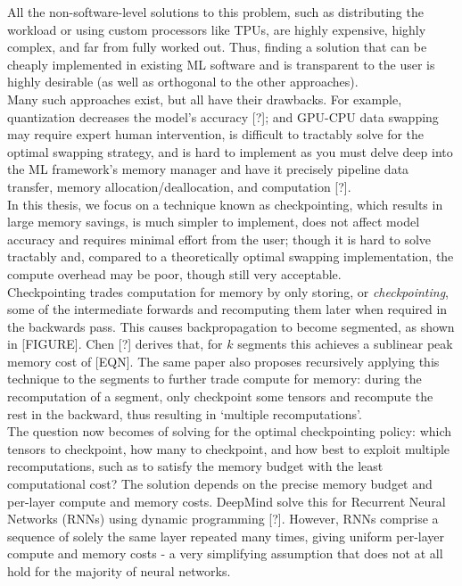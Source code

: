 All the non-software-level solutions to this problem, such as distributing the workload or using custom processors like TPUs, are highly expensive, highly complex, and far from fully worked out. Thus, finding a solution that can be cheaply implemented in existing ML software and is transparent to the user is highly desirable (as well as orthogonal to the other approaches). \\

Many such approaches exist, but all have their drawbacks. For example, quantization decreases the model's accuracy [?]; and GPU-CPU data swapping may require expert human intervention, is difficult to tractably solve for the optimal swapping strategy, and is hard to implement as you must delve deep into the ML framework's memory manager and have it precisely pipeline data transfer, memory allocation/deallocation, and computation [?]. \\

In this thesis, we focus on a technique known as checkpointing, which results in large memory savings, is much simpler to implement, does not affect model accuracy and requires minimal effort from the user; though it is hard to solve tractably and, compared to a theoretically optimal swapping implementation, the compute overhead may be poor, though still very acceptable. \\

Checkpointing trades computation for memory by only storing, or \textit{checkpointing}, some of the intermediate forwards and recomputing them later when required in the backwards pass. This causes backpropagation to become segmented, as shown in [FIGURE]. Chen [?] derives that, for \(k\) segments this achieves a sublinear peak memory cost of [EQN]. The same paper also proposes recursively applying this technique to the segments to further trade compute for memory: during the recomputation of a segment, only checkpoint some tensors and recompute the rest in the backward, thus resulting in `multiple recomputations'. \\

The question now becomes of solving for the optimal checkpointing policy: which tensors to checkpoint, how many to checkpoint, and how best to exploit multiple recomputations, such as to satisfy the memory budget with the least computational cost? The solution depends on the precise memory budget and per-layer compute and memory costs. DeepMind solve this for Recurrent Neural Networks (RNNs) using dynamic programming [?]. However, RNNs comprise a sequence of solely the same layer repeated many times, giving uniform per-layer compute and memory costs - a very simplifying assumption that does not at all hold for the majority of neural networks. \\

